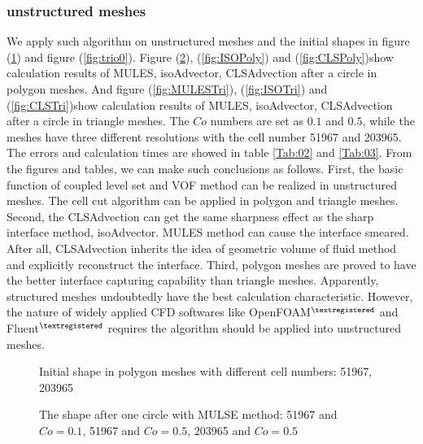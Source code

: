 \subsubsection{unstructured meshes}
We apply such algorithm on unstructured meshes and the initial shapes in figure (\ref{fig:poly0}) and figure (\ref{fig:trio0}). Figure (\ref{fig:MULESPoly}), (\ref{fig:ISOPoly}) and (\ref{fig:CLSPoly})show calculation results of MULES, isoAdvector, CLSAdvection after a circle in polygon meshes. And figure (\ref{fig:MULESTri}), (\ref{fig:ISOTri}) and (\ref{fig:CLSTri})show calculation results of MULES, isoAdvector, CLSAdvection after a circle in triangle meshes. The $Co$ numbers are set as $0.1$ and $0.5$, while the meshes have three different resolutions with the cell number 51967 and 203965. The errors and calculation times are showed in table \ref{Tab:02} and \ref{Tab:03}. From the figures and tables, we can make such conclusions as follows. First, the basic function of coupled level set and VOF method can be realized in unstructured meshes. The cell cut algorithm can be applied in polygon and triangle meshes. Second, the CLSAdvection can get the same sharpness effect as the sharp interface method, isoAdvector. MULES method can cause the interface smeared. After all, CLSAdvection inherits the idea of geometric volume of fluid method and explicitly reconstruct the interface. Third, polygon meshes are proved to have the better interface capturing capability than triangle meshes. Apparently, structured meshes undoubtedly have the best calculation characteristic. However, the nature of widely applied CFD softwares like OpenFOAM$^{\textregistered}$ and Fluent$^{\textregistered}$ requires the algorithm should be applied into unstructured meshes.

\begin{figure}[htbp]
\centering
{}
\quad
{}
\caption{Initial shape in polygon meshes with different cell numbers: 51967,  203965}
\label{fig:poly0}
\end{figure}

\begin{figure}[htbp]
\centering
{}
\quad
{}
\quad
{}
\caption{The shape after one circle with MULSE method: 51967 and $Co=0.1$,  51967 and $Co=0.5$, 203965 and $Co=0.5$}
\label{fig:MULESPoly}
\end{figure}


